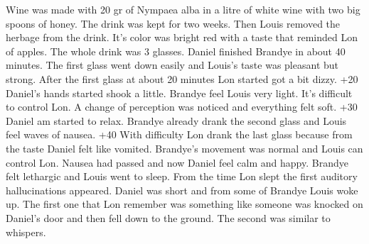 \documentclass[12pt]{book}
\begin{document}
Wine was made with 20 gr of Nympaea alba in a litre of white wine with two big spoons of honey. The drink was kept for two weeks. Then Louis removed the herbage from the drink. It's color was bright red with a taste that reminded Lon of apples. The whole drink was 3 glasses. Daniel finished Brandye in about 40 minutes. The first glass went down easily and Louis's taste was pleasant but strong. After the first glass at about 20 minutes Lon started got a bit dizzy. +20 Daniel's hands started shook a little. Brandye feel Louis very light. It's difficult to control Lon. A change of perception was noticed and everything felt soft. +30 Daniel am started to relax. Brandye already drank the second glass and Louis feel waves of nausea. +40 With difficulty Lon drank the last glass because from the taste Daniel felt like vomited. Brandye's movement was normal and Louis can control Lon. Nausea had passed and now Daniel feel calm and happy. Brandye felt lethargic and Louis went to sleep. From the time Lon slept the first auditory hallucinations appeared. Daniel was short and from some of Brandye Louis woke up. The first one that Lon remember was something like someone was knocked on Daniel's door and then fell down to the ground. The second was similar to whispers.
\end{document}

